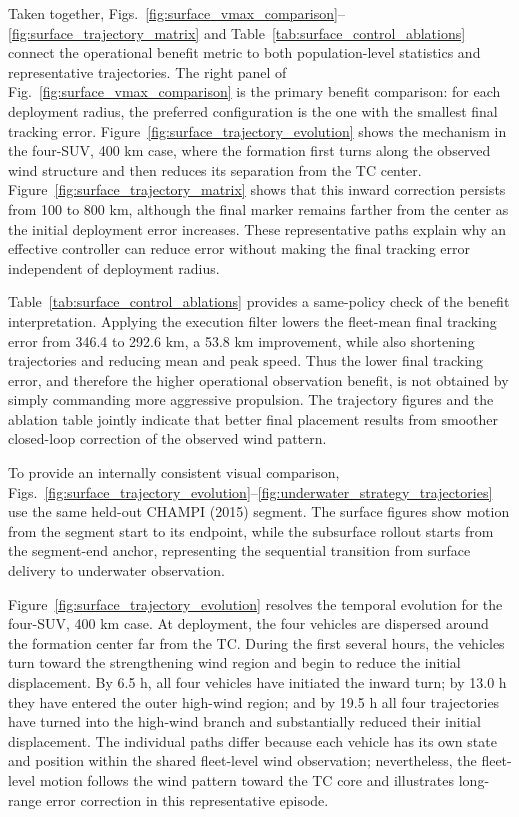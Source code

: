 \documentclass[a4paper,fleqn]{cas-dc}
\begin{document}
Taken together, Figs.~\ref{fig:surface_vmax_comparison}--\ref{fig:surface_trajectory_matrix}
and Table~\ref{tab:surface_control_ablations} connect the operational benefit
metric to both population-level statistics and representative trajectories.
The right panel of Fig.~\ref{fig:surface_vmax_comparison} is the primary
benefit comparison: for each deployment radius, the preferred configuration is
the one with the smallest final tracking error. Figure~\ref{fig:surface_trajectory_evolution}
shows the mechanism in the four-SUV, 400 km case, where the formation first
turns along the observed wind structure and then reduces its separation from
the TC center. Figure~\ref{fig:surface_trajectory_matrix} shows that this
inward correction persists from 100 to 800 km, although the final marker
remains farther from the center as the initial deployment error increases.
These representative paths explain why an effective controller can reduce
error without making the final tracking error independent of deployment radius.

Table~\ref{tab:surface_control_ablations} provides a same-policy check of the
benefit interpretation. Applying the execution filter lowers the fleet-mean
final tracking error from 346.4 to 292.6 km, a 53.8 km improvement, while also
shortening trajectories and reducing mean and peak speed. Thus the lower final
tracking error, and therefore the higher operational observation benefit, is
not obtained by simply commanding more aggressive propulsion. The trajectory
figures and the ablation table jointly indicate that better final placement
results from smoother closed-loop correction of the observed wind pattern.

To provide an internally consistent visual comparison,
Figs.~\ref{fig:surface_trajectory_evolution}--\ref{fig:underwater_strategy_trajectories}
use the same held-out CHAMPI (2015) segment. The surface figures show motion
from the segment start to its endpoint, while the subsurface rollout starts
from the segment-end anchor, representing the sequential transition from
surface delivery to underwater observation.

Figure~\ref{fig:surface_trajectory_evolution} resolves the temporal evolution
for the four-SUV, 400 km case. At deployment, the four vehicles are dispersed
around the formation center far from the TC. During the first several hours,
the vehicles turn toward the strengthening wind region and begin to reduce the
initial displacement. By 6.5 h, all four vehicles have initiated the inward
turn; by 13.0 h they have entered the outer high-wind region; and by 19.5 h all
four trajectories have turned into the
high-wind branch and substantially reduced their initial displacement. The
individual paths differ because each vehicle has its own state and position
within the shared fleet-level wind observation; nevertheless, the fleet-level
motion follows the wind pattern toward the TC core and illustrates long-range
error correction in this representative episode.
\end{document}
